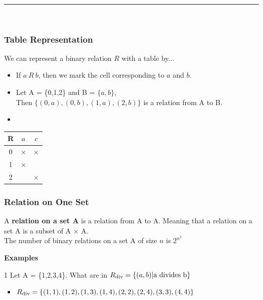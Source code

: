 \documentclass[12pt, letterpaper]{article}
\newcommand{\cul}[1]{%
		\uline{\phantom{#1}}%
		\llap{\contour{white}{#1}}%
	}
\newcommand{\exheader}[1][ex]{{\tiny{#1}\normalsize}}
\newcommand{\horizline}[0]{\noindent\rule{\textwidth}{1pt}\\}
\begin{document}
\vspace*{1cm}

\horizline

\subsubsection{Table Representation}
\begin{minipage}[t]{0.4\linewidth}
	We can represent a binary relation $R$ with a table by... 
	\begin{itemize}
		\item[] If $a\ R\ b$, then we mark the cell corresponding to $a$ and $b$.
	\end{itemize}
\end{minipage} \hspace*{1cm}
\begin{minipage}[t]{0.5\linewidth}
\cul{Example:}
	\begin{itemize}[leftmargin=*, label={}]
		\item Let A = \{0,1,2\} and B = $\{a,b\}$, \\ Then $\{(0,a), (0,b), (1,a), (2,b)\}$ is a relation from A to B.
		\item 
	\end{itemize}
	\begin{center}
		\begin{tabular}{c | c c}
			R & $a$ & $c$ \\
			\hline
			0 & $\times$ & $\times$ \\
			1 & $\times$ & \\
			2 & & $\times$ \\
		\end{tabular}
	\end{center}
\end{minipage}

\pagebreak

\subsubsection{Relation on One Set}
A \textbf{relation on a set A} is a relation from A to A. Meaning that a relation on a set A is a subset of A $\times$ A. \\ 
The number of binary relations on a set A of size $n$ is $2^{n^2}$

\bigbreak

\textbf{Examples} \smallbreak

\exheader[1] Let A = \{1,2,3,4\}. What are in $R_{\textnormal{div}} = \{(a,b) | \textnormal{a divides b}\}$ 
\begin{itemize}[leftmargin=*, label={}]
	\item $R_{\textnormal{div}} = \{(1,1), (1,2), (1,3), (1,4), (2,2), (2,4), (3,3), (4,4)\}$
\end{itemize}
\end{document}
